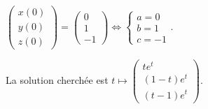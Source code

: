 {\begin{enumerate}
{\begin{center}
$\left(
\begin{array}{c}
x(0)\\
y(0)\\
z(0)
\end{array}
\right)=\left(
\begin{array}{c}
0\\
1\\
-1
\end{array}
\right)\Leftrightarrow\left\{
\begin{array}{l}
a=0\\
b=1\\
c=-1
\end{array}
\right.$.
\end{center}

La solution cherchée est $t\mapsto\left(
 \begin{array}{c}
 te^t\\
 (1-t)e^t\\
 (t-1)e^t
 \end{array}
 \right)$.}
\end{enumerate}
}